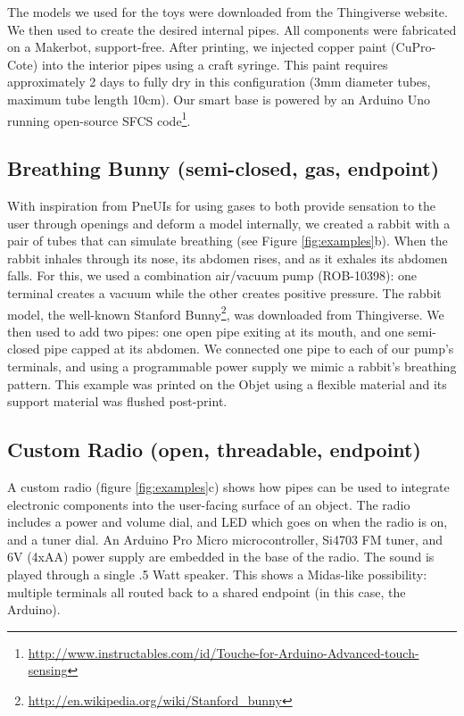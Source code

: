 The models we used for the toys were downloaded from the  Thingiverse website. We then used \systemname to create the desired internal pipes. All components were fabricated on a Makerbot, support-free.  After printing, we injected copper paint (CuPro-Cote) into the interior pipes using a craft syringe.  This paint requires approximately 2 days to fully dry in this configuration (3mm diameter tubes, maximum tube length 10cm).  Our smart base is powered by an Arduino Uno running open-source SFCS code\footnote{\url{http://www.instructables.com/id/Touche-for-Arduino-Advanced-touch-sensing}}.

\subsection{Breathing Bunny (semi-closed, gas, endpoint)}

With inspiration from PneUIs \cite{Yao-pneui} for using gases to both provide sensation to the user through openings and deform a model internally, we created a rabbit with a pair of tubes that can simulate breathing (see Figure \ref{fig:examples}b).  When the rabbit inhales through its nose, its abdomen rises, and as it exhales its abdomen falls.  For this, we used a combination air/vacuum pump (ROB-10398): one terminal creates a vacuum while the other creates positive pressure.  
The rabbit model, the well-known Stanford Bunny\footnote{\url{http://en.wikipedia.org/wiki/Stanford_bunny}}, was downloaded from Thingiverse. We then used \systemname to add two pipes: one open pipe exiting at its mouth, and one semi-closed pipe capped at its abdomen.  We connected one pipe to each of our pump's terminals, and using a programmable power supply we mimic a rabbit's breathing pattern.  This example was printed on the Objet using a flexible material and its support material was flushed post-print.

\subsection{Custom Radio (open, threadable, endpoint)}
A custom radio (figure \ref{fig:examples}c) shows how pipes can be used to integrate electronic components into the user-facing surface of an object. The radio includes a power and volume dial, and LED which goes on when the radio is on, and a tuner dial. An Arduino Pro Micro microcontroller, Si4703 FM tuner, and 6V (4xAA) power supply are embedded in the base of the radio. The sound is played through a single .5 Watt speaker. This shows a Midas-like \cite{Savage-midas} possibility: multiple terminals all routed back to a shared endpoint (in this case, the Arduino). 

